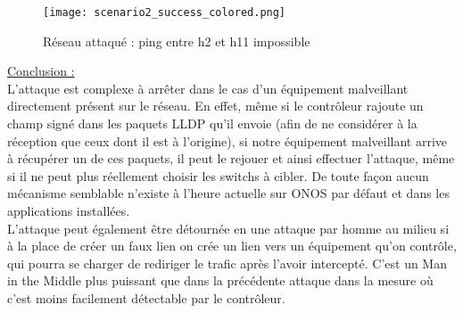 \begin{figure}[h]
  	\centering
  	\texttt{[image: scenario2\_success\_colored.png]}
  	\caption{Réseau attaqué : ping entre h2 et h11 impossible}
\end{figure}

\underline{Conclusion :}\\
L'attaque est complexe à arrêter dans le cas d'un équipement malveillant directement présent sur le réseau. En effet, même si le contrôleur rajoute un champ signé dans les paquets LLDP qu'il envoie (afin de ne considérer à la réception que ceux dont il est à l'origine), si notre équipement malveillant arrive à récupérer un de ces paquets, il peut le rejouer et ainsi effectuer l'attaque, même si il ne peut plus réellement choisir les switchs à cibler. De toute façon aucun mécanisme semblable n'existe à l'heure actuelle sur ONOS par défaut et dans les applications installées.\\
L'attaque peut également être détournée en une attaque par homme au milieu si à la place de créer un faux lien on crée un lien vers un équipement qu'on contrôle, qui pourra se charger de rediriger le trafic après l'avoir intercepté. C'est un Man in the Middle plus puissant que dans la précédente attaque dans la mesure où c'est moins facilement détectable par le contrôleur.
